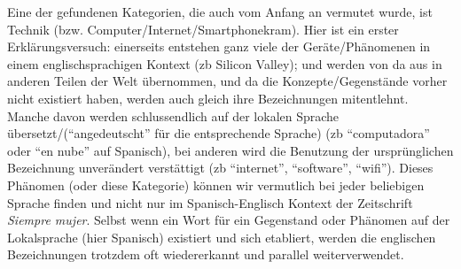 Eine der gefundenen Kategorien, die auch vom Anfang an vermutet wurde, ist Technik (bzw. Computer/Internet/Smartphonekram).
Hier ist ein erster Erklärungsversuch:
einerseits entstehen ganz viele der Geräte/Phänomenen in einem englischsprachigen Kontext (zb Silicon Valley);
und werden von da aus in anderen Teilen der Welt übernommen, und da die Konzepte/Gegenstände vorher nicht existiert haben, werden auch gleich ihre Bezeichnungen mitentlehnt.
Manche davon werden schlussendlich auf der lokalen Sprache übersetzt/(``angedeutscht'' für die entsprechende Sprache) (zb ``computadora'' oder ``en nube'' auf Spanisch), bei anderen wird die Benutzung der ursprünglichen Bezeichnung unverändert verstättigt (zb ``internet'', ``software'', ``wifi'').
Dieses Phänomen (oder diese Kategorie) können wir vermutlich bei jeder beliebigen Sprache finden und nicht nur im Spanisch-Englisch Kontext der Zeitschrift \textit{Siempre mujer}.
Selbst wenn ein Wort für ein Gegenstand oder Phänomen auf der Lokalsprache (hier Spanisch) existiert und sich etabliert, werden die englischen Bezeichnungen trotzdem oft wiedererkannt und parallel weiterverwendet.

